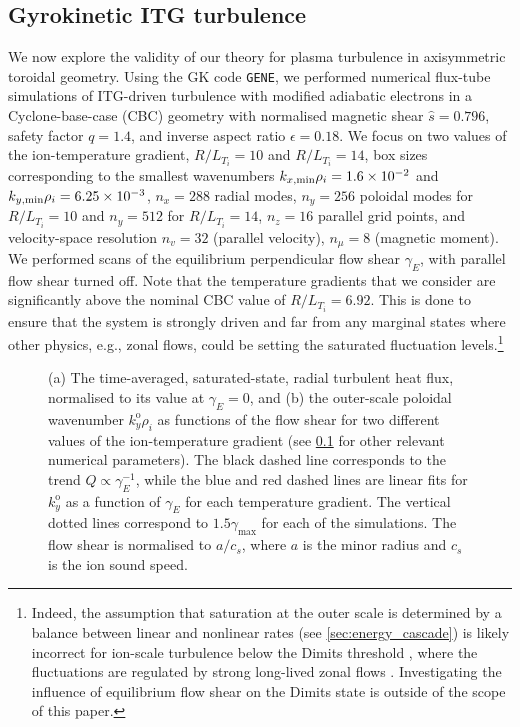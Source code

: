 \documentclass{jpp}
\newcommand{\kyo}{k_y^\text{o}}
\newcommand{\gammaE}{\gamma_{E}}
\begin{document}
\subsection{Gyrokinetic ITG turbulence}
\label{sec:ITG}

We now explore the validity of our theory for plasma turbulence in axisymmetric toroidal geometry. Using the GK code \texttt{GENE}, we performed numerical flux-tube simulations of ITG-driven turbulence with modified adiabatic electrons \citep{hammett93} in a Cyclone-base-case (CBC) \citep{lin99,dimits00} geometry with normalised magnetic shear \(\hat{s}=0.796\), safety factor \(q = 1.4\), and inverse aspect ratio \(\epsilon = 0.18\). We focus on two values of the ion-temperature gradient, \mbox{\(R/L_{T_i} = 10\)} and \mbox{\(R/L_{T_i} = 14\)}, box sizes corresponding to the smallest wavenumbers \mbox{\(k_{x,\text{min}}\rho_i = 1.6\times10^{-2}\)} and \mbox{\(k_{y,\text{min}}\rho_i = 6.25\times10^{-3}\)}, \(n_x = 288\) radial modes, \(n_y=256\) poloidal modes for \(R/L_{T_i} = 10\) and \(n_y=512\) for \(R/L_{T_i} = 14\), \(n_z = 16\) parallel grid points, and velocity-space resolution \(n_v = 32\) (parallel velocity), \(n_\mu = 8\) (magnetic moment). We performed scans of the equilibrium perpendicular flow shear \(\gammaE\), with parallel flow shear turned off. Note that the temperature gradients that we consider are significantly above the nominal CBC value of \(R/L_{T_i} = 6.92\). This is done to ensure that the system is strongly driven and far from any marginal states where other physics, e.g., zonal flows, could be setting the saturated fluctuation levels.\footnote{Indeed, the assumption that saturation at the outer scale is determined by a balance between linear and nonlinear rates (see \cref{sec:energy_cascade}) is likely incorrect for ion-scale turbulence below the Dimits threshold \citep{dimits00}, where the fluctuations are regulated by strong long-lived zonal flows \citep{rogers00,diamond05,zhu20_prl,zhu20_jpp, ivanov20}. Investigating the influence of equilibrium flow shear on the Dimits state is outside of the scope of this paper.}

\begin{figure}
	\centering
	\caption{(a) The time-averaged, saturated-state, radial turbulent heat flux, normalised to its value at \(\gammaE = 0\), and (b) the outer-scale poloidal wavenumber \(\kyo\rho_i\) as functions of the flow shear for two different values of the ion-temperature gradient (see \cref{sec:ITG} for other relevant numerical parameters). The black dashed line corresponds to the trend \(Q \propto \gammaE^{-1}\), while the blue and red dashed lines are linear fits for \(\kyo\) as a function of \(\gammaE\) for each temperature gradient. The vertical dotted lines correspond to \(1.5\gamma_\text{max}\) for each of the simulations. The flow shear is normalised to \(a/c_s\), where \(a\) is the minor radius and \(c_s\) is the ion sound speed.}
	\label{fig:GK_Q_vs_gammaE}
	\label{fig:GK_outerscale_vs_gammaE}
\end{figure}
\end{document}
